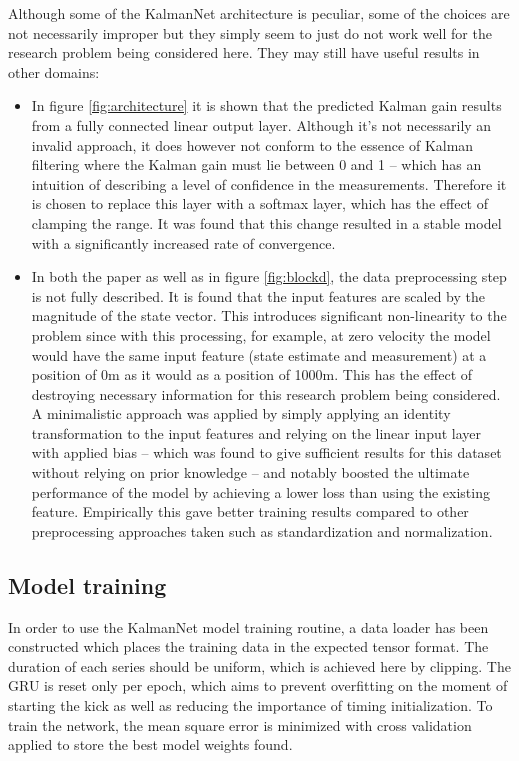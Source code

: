 \documentclass[a4paper,twoside,12pt]{report}
\begin{document}
Although some of the KalmanNet architecture is peculiar, some of the choices are not necessarily improper but they simply seem to just do not work well for the research problem being considered here. They may still have useful results in other domains:
\begin{itemize}
    \item In figure \ref{fig:architecture} it is shown that the predicted Kalman gain results from a fully connected linear output layer. Although it's not necessarily an invalid approach, it does however not conform to the essence of Kalman filtering where the Kalman gain must lie between 0 and 1 -- which has an intuition of describing a level of confidence in the measurements. Therefore it is chosen to replace this layer with a softmax layer, which has the effect of clamping the range. It was found that this change resulted in a stable model with a significantly increased rate of convergence.
    \item In both the \cite{kalmannet} paper as well as in figure \ref{fig:blockd}, the data preprocessing step is not fully described. It is found that the input features are scaled by the magnitude of the state vector. This introduces significant non-linearity to the problem since with this processing, for example, at zero velocity the model would have the same input feature (state estimate and measurement) at a position of 0m as it would as a position of 1000m. This has the effect of destroying necessary information for this research problem being considered. A minimalistic approach was applied by simply applying an identity transformation to the input features and relying on the linear input layer with applied bias -- which was found to give sufficient results for this dataset without relying on prior knowledge -- and notably boosted the ultimate performance of the model by achieving a lower loss than using the existing feature. Empirically this gave better training results compared to other preprocessing approaches taken such as standardization and normalization.
\end{itemize}


\subsection{Model training}

In order to use the KalmanNet model training routine, a data loader has been constructed which places the training data in the expected tensor format. The duration of each series should be uniform, which is achieved here by clipping. The GRU is reset only per epoch, which aims to prevent overfitting on the moment of starting the kick as well as reducing the importance of timing initialization. To train the network, the mean square error is minimized with cross validation applied to store the best model weights found.
\end{document}
